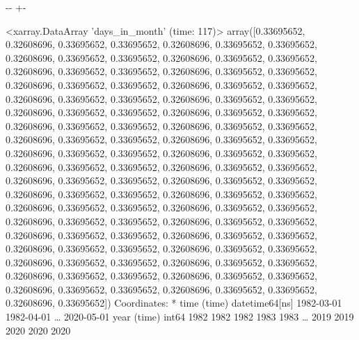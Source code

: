 \documentclass[letterpaper,10pt,english]{sphinxmanual}
\newlength\nbsphinxcodecellspacing
\begin{document}
{

\kern-\sphinxverbatimsmallskipamount\kern-\baselineskip
\kern+\FrameHeightAdjust\kern-\fboxrule
\vspace{\nbsphinxcodecellspacing}

\begin{sphinxVerbatim}[commandchars=\\\{\}]
\llap{\color{nbsphinxout}[15]:\,\hspace{\fboxrule}\hspace{\fboxsep}}<xarray.DataArray 'days\_in\_month' (time: 117)>
array([0.33695652, 0.32608696, 0.33695652, 0.33695652, 0.32608696,
       0.33695652, 0.33695652, 0.32608696, 0.33695652, 0.33695652,
       0.32608696, 0.33695652, 0.33695652, 0.32608696, 0.33695652,
       0.33695652, 0.32608696, 0.33695652, 0.33695652, 0.32608696,
       0.33695652, 0.33695652, 0.32608696, 0.33695652, 0.33695652,
       0.32608696, 0.33695652, 0.33695652, 0.32608696, 0.33695652,
       0.33695652, 0.32608696, 0.33695652, 0.33695652, 0.32608696,
       0.33695652, 0.33695652, 0.32608696, 0.33695652, 0.33695652,
       0.32608696, 0.33695652, 0.33695652, 0.32608696, 0.33695652,
       0.33695652, 0.32608696, 0.33695652, 0.33695652, 0.32608696,
       0.33695652, 0.33695652, 0.32608696, 0.33695652, 0.33695652,
       0.32608696, 0.33695652, 0.33695652, 0.32608696, 0.33695652,
       0.33695652, 0.32608696, 0.33695652, 0.33695652, 0.32608696,
       0.33695652, 0.33695652, 0.32608696, 0.33695652, 0.33695652,
       0.32608696, 0.33695652, 0.33695652, 0.32608696, 0.33695652,
       0.33695652, 0.32608696, 0.33695652, 0.33695652, 0.32608696,
       0.33695652, 0.33695652, 0.32608696, 0.33695652, 0.33695652,
       0.32608696, 0.33695652, 0.33695652, 0.32608696, 0.33695652,
       0.33695652, 0.32608696, 0.33695652, 0.33695652, 0.32608696,
       0.33695652, 0.33695652, 0.32608696, 0.33695652, 0.33695652,
       0.32608696, 0.33695652, 0.33695652, 0.32608696, 0.33695652,
       0.33695652, 0.32608696, 0.33695652, 0.33695652, 0.32608696,
       0.33695652, 0.33695652, 0.32608696, 0.33695652, 0.33695652,
       0.32608696, 0.33695652])
Coordinates:
  * time     (time) datetime64[ns] 1982-03-01 1982-04-01 {\ldots} 2020-05-01
    year     (time) int64 1982 1982 1982 1983 1983 {\ldots} 2019 2019 2020 2020 2020
\end{sphinxVerbatim}
}
\end{document}

